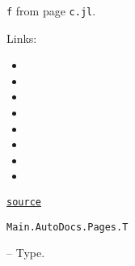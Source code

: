 \begin{adjustwidth}{2em}{0pt}

\texttt{f} from page \texttt{c.jl}.

Links:

\begin{itemize}
\item {}


\item {}


\item {}


\item {}


\item {}


\item {}


\item {}


\item {}

\end{itemize}


\href{https://github.com/BambOoxX/Documenter.jl/blob/d157febde213549ed0d45c894f0651560da477d3/test/examples/pages/c.jl#L2-L16}{\texttt{source}}


\end{adjustwidth}
\hypertarget{5246990970960098088}{\texttt{Main.AutoDocs.Pages.T}}  -- {Type.}

